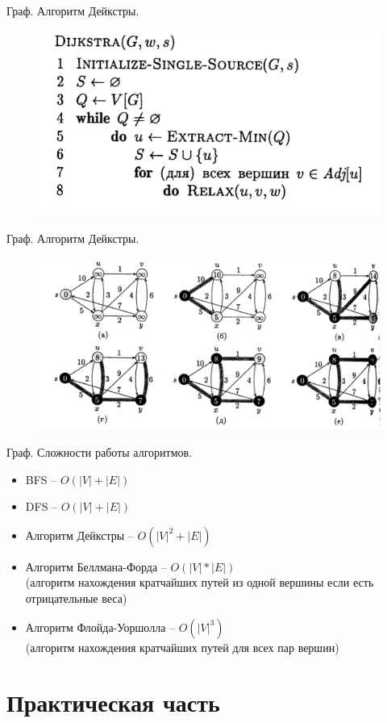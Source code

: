 \documentclass[newPxFont]{beamer}
\begin{document}
\begin{frame}{Граф. Алгоритм Дейкстры.}
\begin{figure}
\centerline{\includegraphics[width=1.0\linewidth]{images/deicstra_algo.png}}
\end{figure}
\end{frame}

\begin{frame}{Граф. Алгоритм Дейкстры.}
\begin{figure}
\centerline{\includegraphics[width=1.0\linewidth]{images/deicstra_graphs.png}}
\end{figure}
\end{frame}



\begin{frame}{Граф. Сложности работы алгоритмов.}
\begin{itemize}
\item BFS -- $O(|V| + |E|)$
\item DFS -- $O(|V| + |E|)$
\item Алгоритм Дейкстры -- $O(|V|^2 + |E|)$
\item Алгоритм Беллмана-Форда -- $O(|V|*|E|)$ \\
(алгоритм нахождения кратчайших путей из одной вершины если есть отрицательные веса)
\item Алгоритм Флойда-Уоршолла -- $O(|V|^3)$ \\
(алгоритм нахождения кратчайших путей для всех пар вершин)
\end{itemize}
\end{frame}



\section{Практическая часть}
\end{document}

